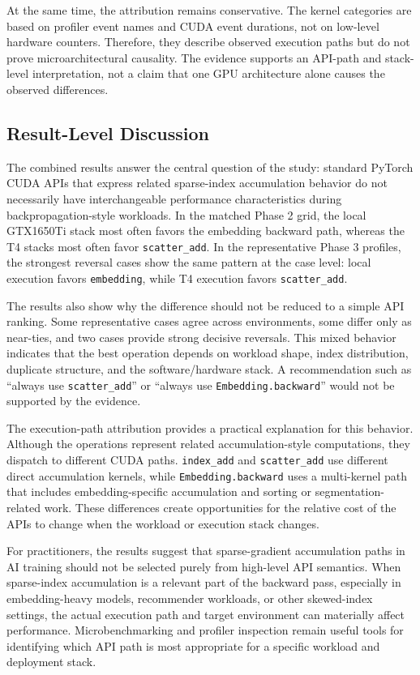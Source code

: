 At the same time, the attribution remains conservative. The kernel categories are based on profiler event names and CUDA event durations, not on low-level hardware counters. Therefore, they describe observed execution paths but do not prove microarchitectural causality. The evidence supports an API-path and stack-level interpretation, not a claim that one GPU architecture alone causes the observed differences.

\subsection{Result-Level Discussion}

The combined results answer the central question of the study: standard PyTorch CUDA APIs that express related sparse-index accumulation behavior do not necessarily have interchangeable performance characteristics during backpropagation-style workloads. In the matched Phase 2 grid, the local GTX1650Ti stack most often favors the embedding backward path, whereas the T4 stacks most often favor \texttt{scatter\_add}. In the representative Phase 3 profiles, the strongest reversal cases show the same pattern at the case level: local execution favors \texttt{embedding}, while T4 execution favors \texttt{scatter\_add}.

The results also show why the difference should not be reduced to a simple API ranking. Some representative cases agree across environments, some differ only as near-ties, and two cases provide strong decisive reversals. This mixed behavior indicates that the best operation depends on workload shape, index distribution, duplicate structure, and the software/hardware stack. A recommendation such as ``always use \texttt{scatter\_add}'' or ``always use \texttt{Embedding.backward}'' would not be supported by the evidence.

The execution-path attribution provides a practical explanation for this behavior. Although the operations represent related accumulation-style computations, they dispatch to different CUDA paths. \texttt{index\_add} and \texttt{scatter\_add} use different direct accumulation kernels, while \texttt{Embedding.backward} uses a multi-kernel path that includes embedding-specific accumulation and sorting or segmentation-related work. These differences create opportunities for the relative cost of the APIs to change when the workload or execution stack changes.

For practitioners, the results suggest that sparse-gradient accumulation paths in AI training should not be selected purely from high-level API semantics. When sparse-index accumulation is a relevant part of the backward pass, especially in embedding-heavy models, recommender workloads, or other skewed-index settings, the actual execution path and target environment can materially affect performance. Microbenchmarking and profiler inspection remain useful tools for identifying which API path is most appropriate for a specific workload and deployment stack.

